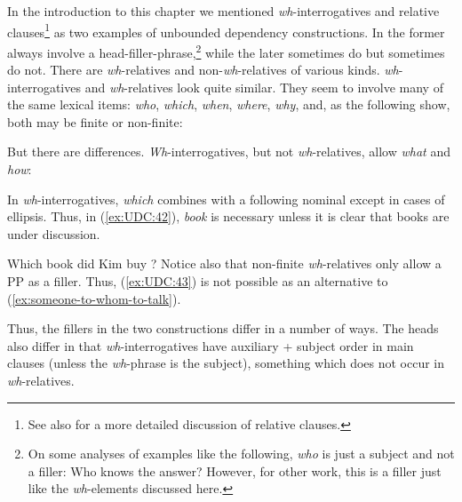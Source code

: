 \documentclass[output=paper
,notxmath 
 	        ,biblatex
                ,babelshorthands
                ,newtxmath
                ,draftmode
                ,colorlinks, citecolor=brown
]{langscibook}
\begin{document}
In the introduction to this chapter we mentioned
\emph{wh}-interrogatives and relative clauses\footnote{
{See also  for a more detailed discussion of relative clauses.}} as two examples of
unbounded dependency constructions. In  the former always involve
a head-filler-phrase,\footnote{On some analyses of examples like the
  following, \emph{who} is just a subject and not a filler:
\ea
Who knows the answer?
\z
However, for other work, this is a filler just like the
  \emph{wh}-elements discussed here.
} while the later sometimes do but
sometimes do not. There are \emph{wh}-relatives and
non-\emph{wh}-relatives of various kinds. 
\emph{wh}-interrogatives and \emph{wh}-relatives look quite similar.
They seem to involve many of the same lexical items: \emph{who},
\emph{which}, \emph{when}, \emph{where}, \emph{why}, and, as the
following show, both may be finite or non-finite:

\eal
\label{ex:UDC:38}

\zl

\eal
\label{ex:UDC:39}
\zl

\noindent
But there are differences. \emph{Wh}-interrogatives, but not
\emph{wh}-relatives, allow \emph{what} and \emph{how}:

\eal
\label{ex:UDC:40}
\zl

\eal
\label{ex:UDC:41}
\zl

\noindent
In \emph{wh}-interrogatives, \emph{which} combines with a following
nominal except in cases of ellipsis. Thus, in (\ref{ex:UDC:42}), \emph{book} is
necessary unless it is clear that books are under discussion.

\ea
\label{ex:UDC:42}
Which book did Kim buy \trace{}?
\z
\noindent
Notice also that non-finite \emph{wh}-relatives only allow a PP as a
filler. Thus, (\ref{ex:UDC:43}) is not possible as an alternative to (\ref{ex:someone-to-whom-to-talk}).

\begin{exe}
     \label{ex:UDC:43}
\end{exe}

\noindent
Thus, the fillers in the two constructions differ in a number of ways.
The heads also differ in that \emph{wh}-interrogatives have auxiliary +
subject order in main clauses (unless the \emph{wh}-phrase is the
subject), something which does not occur in \emph{wh}-relatives.
\end{document}
